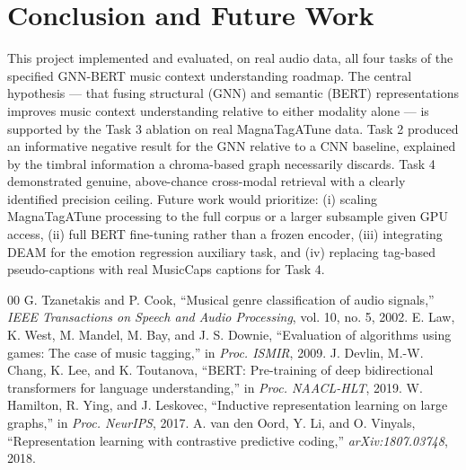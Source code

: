 \documentclass[conference]{IEEEtran}
\begin{document}
\section{Conclusion and Future Work}
This project implemented and evaluated, on real audio data, all four tasks of the specified GNN-BERT music context understanding roadmap. The central hypothesis --- that fusing structural (GNN) and semantic (BERT) representations improves music context understanding relative to either modality alone --- is supported by the Task 3 ablation on real MagnaTagATune data. Task 2 produced an informative negative result for the GNN relative to a CNN baseline, explained by the timbral information a chroma-based graph necessarily discards. Task 4 demonstrated genuine, above-chance cross-modal retrieval with a clearly identified precision ceiling. Future work would prioritize: (i) scaling MagnaTagATune processing to the full corpus or a larger subsample given GPU access, (ii) full BERT fine-tuning rather than a frozen encoder, (iii) integrating DEAM for the emotion regression auxiliary task, and (iv) replacing tag-based pseudo-captions with real MusicCaps captions for Task 4.

\begin{thebibliography}{00}
 G. Tzanetakis and P. Cook, ``Musical genre classification of audio signals,'' \emph{IEEE Transactions on Speech and Audio Processing}, vol. 10, no. 5, 2002.
 E. Law, K. West, M. Mandel, M. Bay, and J. S. Downie, ``Evaluation of algorithms using games: The case of music tagging,'' in \emph{Proc. ISMIR}, 2009.
 J. Devlin, M.-W. Chang, K. Lee, and K. Toutanova, ``BERT: Pre-training of deep bidirectional transformers for language understanding,'' in \emph{Proc. NAACL-HLT}, 2019.
 W. Hamilton, R. Ying, and J. Leskovec, ``Inductive representation learning on large graphs,'' in \emph{Proc. NeurIPS}, 2017.
 A. van den Oord, Y. Li, and O. Vinyals, ``Representation learning with contrastive predictive coding,'' \emph{arXiv:1807.03748}, 2018.
\end{thebibliography}
\end{document}

